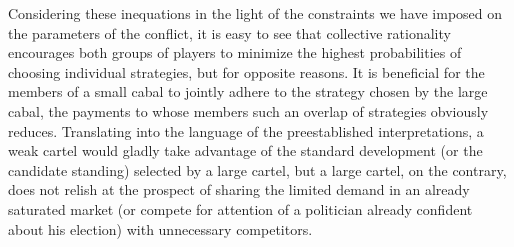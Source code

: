 Considering these inequations in the light of the constraints we have imposed on the parameters of the conflict, it is easy to see that collective rationality encourages both groups of players to minimize the highest probabilities of choosing individual strategies, but for opposite reasons. It is beneficial for the members of a small cabal to jointly adhere to the strategy chosen by the large cabal, the payments to whose members such an overlap of strategies obviously reduces. Translating into the language of the preestablished interpretations, a weak cartel would gladly take advantage of the standard development (or the candidate standing) selected by a large cartel, but a large cartel, on the contrary, does not relish at the prospect of sharing the limited demand in an already saturated market (or compete for attention of a politician already confident about his election) with unnecessary competitors. %

